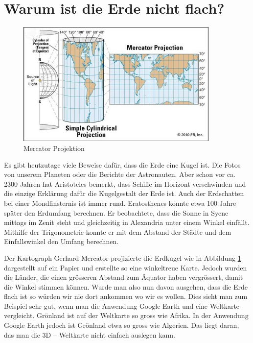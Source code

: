 

\section{Warum ist die Erde nicht flach?}
\begin{figure}
	\begin{center}
		\includegraphics[width=10cm]{papers/nav/bilder/projektion.png}
		\caption[Mercator Projektion]{Mercator Projektion}
		\label{merc}
	\end{center}	
\end{figure}

Es gibt heutzutage viele Beweise dafür, dass die Erde eine Kugel ist. 
Die Fotos von unserem	Planeten oder die Berichte der Astronauten. 
Aber schon vor ca. 2300 Jahren hat Aristoteles bemerkt, dass Schiffe im Horizont verschwinden und die einzige Erklärung dafür die Kugelgestalt der Erde ist.
Auch der Erdschatten bei einer Mondfinsternis ist immer rund.
Eratosthenes konnte etwa 100 Jahre später den Erdumfang berechnen. 
Er beobachtete, dass die Sonne in Syene mittags im Zenit steht und gleichzeitig in Alexandria unter einem Winkel einfällt. 
Mithilfe der Trigonometrie konnte er mit dem Abstand der Städte und dem Einfallswinkel den Umfang berechnen.

Der Kartograph Gerhard Mercator projizierte die Erdkugel wie in Abbildung \ref{merc} dargestellt auf ein Papier und erstellte so eine winkeltreue Karte. 
Jedoch wurden die Länder, die einen grösseren Abstand zum Äquator haben vergrössert, damit die Winkel stimmen können. 
Wurde man also nun davon ausgehen, dass die Erde flach ist so würden wir nie dort ankommen wo wir es wollen.
Dies sieht man zum Beispiel sehr gut, wenn man die Anwendung Google Earth und eine Weltkarte vergleicht. 
Grönland ist auf der Weltkarte so gross wie Afrika. 
In der Anwendung Google Earth jedoch ist Grönland etwa so gross wie Algerien. 
Das liegt daran, das man die 3D – Weltkarte nicht einfach auslegen kann. 

